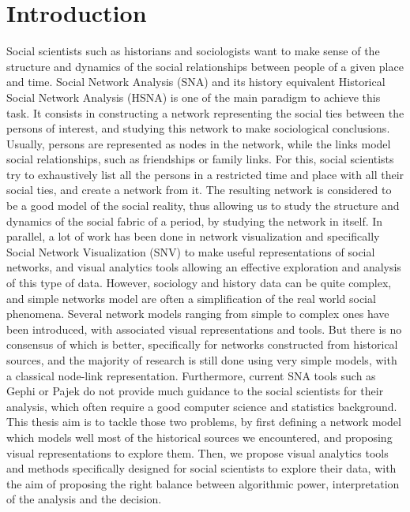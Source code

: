 


\section{Introduction}

Social scientists such as historians and sociologists want to make sense of the structure and dynamics of the social relationships between people of a given place and time.
Social Network Analysis (SNA) and its history equivalent Historical Social Network Analysis (HSNA) is one of the main paradigm to achieve this task.
It consists in constructing a network representing the social ties between the persons of interest, and studying this network to make sociological conclusions. Usually, persons are represented as nodes in the network, while the links model social relationships, such as friendships or family links. For this, social scientists try to exhaustively list all the persons in a restricted time and place with all their social ties, and create a network from it.
The resulting network is considered to be a good model of the social reality, thus allowing us to study the structure and dynamics of the social fabric of a period, by studying the network in itself.
In parallel, a lot of work has been done in network visualization and specifically Social Network Visualization (SNV) to make useful representations of social networks, and visual analytics tools allowing an effective exploration and analysis of this type of data.
However, sociology and history data can be quite complex, and simple networks model are often a simplification of the real world social phenomena.
Several network models ranging from simple to complex ones have been introduced, with associated visual representations and tools. But there is no consensus of which is better, specifically for networks constructed from historical sources, and the majority of research is still done using very simple models, with a classical node-link representation.
Furthermore, current SNA tools such as Gephi or Pajek do not provide much guidance to the social scientists for their analysis, which often require a good computer science and statistics background.
This thesis aim is to tackle those two problems, by first defining a network model which models well most of the historical sources we encountered, and proposing visual representations to explore them.
Then, we propose visual analytics tools and methods specifically designed for social scientists to explore their data, with the aim of proposing the right balance between algorithmic power, interpretation of the analysis and the decision.

